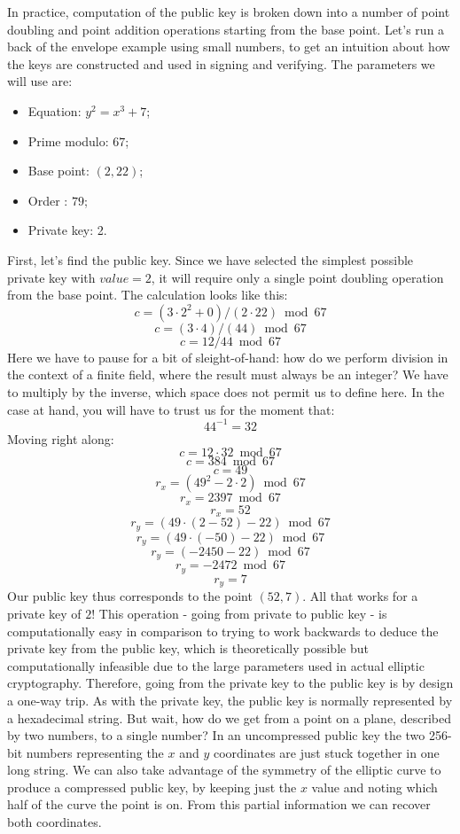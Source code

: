 \documentclass{article}
\begin{document}
\noindent In practice, computation of the public key is broken down into a number of point doubling and point addition operations starting from the base point.\newline
Let’s run a back of the envelope example using small numbers, to get an intuition about how the keys are constructed and used in signing and verifying. The parameters we will use are:
\begin{itemize}
    \item Equation: \(y^2 = x^3 + 7\);
    \item Prime modulo: \(67\);
    \item Base point: \((2, 22)\);
    \item Order : \(79\);
    \item Private key: 2.
\end{itemize}
First, let’s find the public key. Since we have selected the simplest possible private key with \(value = 2\), it will require only a single point doubling operation from the base point. The calculation looks like this:
\[c = (3 \cdot 2^2 + 0)/(2 \cdot 22) \bmod 67\]
\[c = (3 \cdot 4)/(44) \bmod 67\]
\[c = 12/44 \bmod 67\]
Here we have to pause for a bit of sleight-of-hand: how do we perform division in the context of a finite field, where the result must always be an integer? We have to multiply by the inverse, which space does not permit us to define here. In the case at hand, you will have to trust us for the moment that:
\[44^{-1} = 32\]
Moving right along:
\[c = 12 \cdot 32 \bmod 67\] 
\[c = 384 \bmod 67\]
\[c = 49\]
\newline
\[r_x = (49^2 - 2 \cdot 2) \bmod 67\]
\[r_x = 2397 \bmod 67\]
\[r_x = 52\]
\newline
\[r_y =(49 \cdot (2 - 52) - 22) \bmod 67\]
\[r_y =(49 \cdot (-50) - 22) \bmod 67\]
\[r_y = (-2450 - 22) \bmod 67\]
\[r_y = -2472 \bmod 67\]
\[r_y = 7\]
Our public key thus corresponds to the point \((52, 7)\). All that works for a private key of \(2\)!\newline
This operation - going from private to public key - is computationally easy in comparison to trying to work backwards to deduce the private key from the public key, which is theoretically possible but computationally infeasible due to the large parameters used in actual elliptic cryptography.\newline
Therefore, going from the private key to the public key is by design a one-way trip.\newline
As with the private key, the public key is normally represented by a hexadecimal string. But wait, how do we get from a point on a plane, described by two numbers, to a single number? In an uncompressed public key the two 256-bit numbers representing the \(x\) and \(y\) coordinates are just stuck together in one long string. We can also take advantage of the symmetry of the elliptic curve to produce a compressed public key, by keeping just the \(x\) value and noting which half of the curve the point is on. From this partial information we can recover both coordinates.
\end{document}
